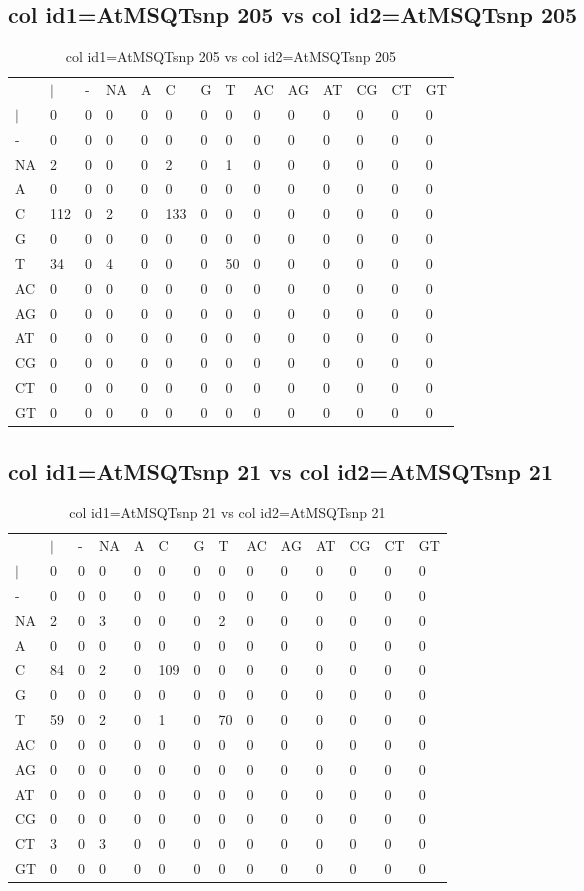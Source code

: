 \subsection{col id1=AtMSQTsnp 205 vs col id2=AtMSQTsnp 205}
\begin{center}
\begin{longtable}{|l|l|l|l|l|l|l|l|l|l|l|l|l|l|}
\caption{col id1=AtMSQTsnp 205 vs col id2=AtMSQTsnp 205} \label{table_dm770}\\
\hline
\\
\hline
&$|$&-&NA&A&C&G&T&AC&AG&AT&CG&CT&GT\\
$|$&0&0&0&0&0&0&0&0&0&0&0&0&0\\
-&0&0&0&0&0&0&0&0&0&0&0&0&0\\
NA&2&0&0&0&2&0&1&0&0&0&0&0&0\\
A&0&0&0&0&0&0&0&0&0&0&0&0&0\\
C&112&0&2&0&133&0&0&0&0&0&0&0&0\\
G&0&0&0&0&0&0&0&0&0&0&0&0&0\\
T&34&0&4&0&0&0&50&0&0&0&0&0&0\\
AC&0&0&0&0&0&0&0&0&0&0&0&0&0\\
AG&0&0&0&0&0&0&0&0&0&0&0&0&0\\
AT&0&0&0&0&0&0&0&0&0&0&0&0&0\\
CG&0&0&0&0&0&0&0&0&0&0&0&0&0\\
CT&0&0&0&0&0&0&0&0&0&0&0&0&0\\
GT&0&0&0&0&0&0&0&0&0&0&0&0&0\\
\hline
\end{longtable}
\end{center}

\subsection{col id1=AtMSQTsnp 21 vs col id2=AtMSQTsnp 21}
\begin{center}
\begin{longtable}{|l|l|l|l|l|l|l|l|l|l|l|l|l|l|}
\caption{col id1=AtMSQTsnp 21 vs col id2=AtMSQTsnp 21} \label{table_dm772}\\
\hline
\\
\hline
&$|$&-&NA&A&C&G&T&AC&AG&AT&CG&CT&GT\\
$|$&0&0&0&0&0&0&0&0&0&0&0&0&0\\
-&0&0&0&0&0&0&0&0&0&0&0&0&0\\
NA&2&0&3&0&0&0&2&0&0&0&0&0&0\\
A&0&0&0&0&0&0&0&0&0&0&0&0&0\\
C&84&0&2&0&109&0&0&0&0&0&0&0&0\\
G&0&0&0&0&0&0&0&0&0&0&0&0&0\\
T&59&0&2&0&1&0&70&0&0&0&0&0&0\\
AC&0&0&0&0&0&0&0&0&0&0&0&0&0\\
AG&0&0&0&0&0&0&0&0&0&0&0&0&0\\
AT&0&0&0&0&0&0&0&0&0&0&0&0&0\\
CG&0&0&0&0&0&0&0&0&0&0&0&0&0\\
CT&3&0&3&0&0&0&0&0&0&0&0&0&0\\
GT&0&0&0&0&0&0&0&0&0&0&0&0&0\\
\hline
\end{longtable}
\end{center}

